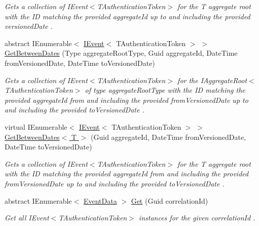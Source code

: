 \begin{DoxyCompactItemize}
\begin{DoxyCompactList}\small\item\em Gets a collection of I\+Event$<$\+T\+Authentication\+Token$>$ for the {\itshape T} aggregate root with the ID matching the provided {\itshape aggregate\+Id}  up to and including the provided {\itshape versioned\+Date} . \end{DoxyCompactList}\item 
abstract I\+Enumerable$<$ \hyperlink{interfaceCqrs_1_1Events_1_1IEvent}{I\+Event}$<$ T\+Authentication\+Token $>$ $>$ \hyperlink{classCqrs_1_1Events_1_1EventStore_add415731fcea6a9367e1031c4608c922_add415731fcea6a9367e1031c4608c922}{Get\+Between\+Dates} (Type aggregate\+Root\+Type, Guid aggregate\+Id, Date\+Time from\+Versioned\+Date, Date\+Time to\+Versioned\+Date)
\begin{DoxyCompactList}\small\item\em Gets a collection of I\+Event$<$\+T\+Authentication\+Token$>$ for the I\+Aggregate\+Root$<$\+T\+Authentication\+Token$>$ of type {\itshape aggregate\+Root\+Type}  with the ID matching the provided {\itshape aggregate\+Id}  from and including the provided {\itshape from\+Versioned\+Date}  up to and including the provided {\itshape to\+Versioned\+Date} . \end{DoxyCompactList}\item 
virtual I\+Enumerable$<$ \hyperlink{interfaceCqrs_1_1Events_1_1IEvent}{I\+Event}$<$ T\+Authentication\+Token $>$ $>$ \hyperlink{classCqrs_1_1Events_1_1EventStore_a273b6bf609a82564fda68380d381209e_a273b6bf609a82564fda68380d381209e}{Get\+Between\+Dates$<$ T $>$} (Guid aggregate\+Id, Date\+Time from\+Versioned\+Date, Date\+Time to\+Versioned\+Date)
\begin{DoxyCompactList}\small\item\em Gets a collection of I\+Event$<$\+T\+Authentication\+Token$>$ for the {\itshape T} aggregate root with the ID matching the provided {\itshape aggregate\+Id}  from and including the provided {\itshape from\+Versioned\+Date}  up to and including the provided {\itshape to\+Versioned\+Date} . \end{DoxyCompactList}\item 
abstract I\+Enumerable$<$ \hyperlink{classCqrs_1_1Events_1_1EventData}{Event\+Data} $>$ \hyperlink{classCqrs_1_1Events_1_1EventStore_a0096646f5dff730b0041b9469719c420_a0096646f5dff730b0041b9469719c420}{Get} (Guid correlation\+Id)
\begin{DoxyCompactList}\small\item\em Get all I\+Event$<$\+T\+Authentication\+Token$>$ instances for the given {\itshape correlation\+Id} . \end{DoxyCompactList}\end{DoxyCompactItemize}
